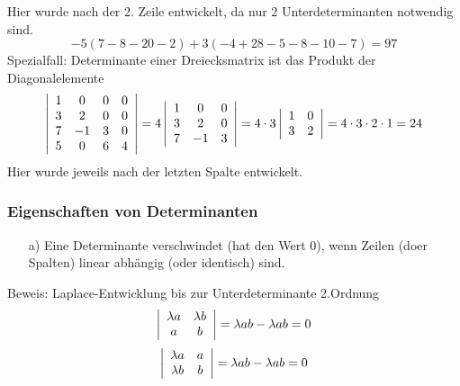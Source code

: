 \documentclass{article}
\begin{document}
Hier wurde nach der 2. Zeile entwickelt, da nur 2 Unterdeterminanten notwendig sind.\\
\begin{equation*}
    -5(7-8-20-2)+3(-4+28-5-8-10-7) = 97
\end{equation*}
Spezialfall: Determinante einer Dreiecksmatrix ist das Produkt der Diagonalelemente
\begin{equation*}
    \left\lvert \begin{array}{c c c c}1&0&0&0\\3&2&0&0\\7&-1&3&0\\5&0&6&4\end{array} \right\rvert = 4 \left\lvert \begin{array}{c c c}1&0&0\\3&2&0\\7&-1&3\end{array} \right\rvert = 4 \cdot 3 \left\lvert \begin{array}{c c}1&0\\3&2\end{array} \right\rvert = 4 \cdot 3 \cdot 2 \cdot 1 = 24
\end{equation*}
Hier wurde jeweils nach der letzten Spalte entwickelt.
\subsubsection{Eigenschaften von Determinanten}
\begin{itemize}
    \item[a)] Eine Determinante verschwindet (hat den  Wert 0), wenn Zeilen (doer Spalten) linear abhängig (oder identisch) sind.
\end{itemize}
Beweis: Laplace-Entwicklung bis zur Unterdeterminante 2.Ordnung
\begin{equation*}
    \left\lvert \begin{array}{c c}\lambda a & \lambda b\\a&b\end{array}\right\rvert = \lambda ab - \lambda ab = 0
\end{equation*}
\begin{equation*}
    \left\lvert \begin{array}{c c} \lambda a & a\\ \lambda b & b\end{array} \right\rvert = \lambda ab - \lambda ab = 0
\end{equation*}
\end{document}
